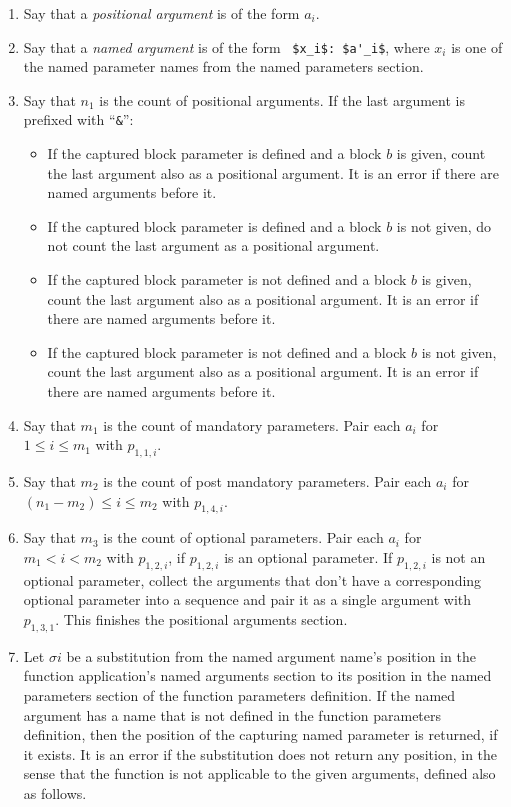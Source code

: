 \begin{enumerate}

\item Say that a {\em positional argument} is of the form $a_i$. 

\item Say that a {\em named argument} is of the form ~\lstinline!$x_i$: $a'_i$!, where $x_i$ is one of the named parameter names from the named parameters section. 

\item Say that $n_1$ is the count of positional arguments. If the last argument is prefixed with ``\lstinline!&!'':
\begin{itemize} 
\item If the captured block parameter is defined and a block $b$ is given, count the last argument also as a positional argument. It is an error if there are named arguments before it. 
\item If the captured block parameter is defined and a block $b$ is not given, do not count the last argument as a positional argument. 
\item If the captured block parameter is not defined and a block $b$ is given, count the last argument also as a positional argument. It is an error if there are named arguments before it. 
\item If the captured block parameter is not defined and a block $b$ is not given, count the last argument also as a positional argument. It is an error if there are named arguments before it. 
\end{itemize}

\item Say that $m_1$ is the count of mandatory parameters. Pair each $a_i$ for $1 \leq i \leq m_1$ with $p_{1,1,i}$. 

\item Say that $m_2$ is the count of post mandatory parameters. Pair each $a_i$ for $(n_1 - m_2) \leq i \leq m_2$ with $p_{1,4,i}$.

\item Say that $m_3$ is the count of optional parameters. Pair each $a_i$ for $m_1 < i < m_2$ with $p_{1,2,i}$, if $p_{1,2,i}$ is an optional parameter. If $p_{1,2,i}$ is not an optional parameter, collect the arguments that don't have a corresponding optional parameter into a sequence and pair it as a single argument with $p_{1,3,1}$. This finishes the positional arguments section. 

\item Let $\sigma i$ be a substitution from the named argument name's position in the function application's named arguments section to its position in the named parameters section of the function parameters definition. If the named argument has a name that is not defined in the function parameters definition, then the position of the capturing named parameter is returned, if it exists. It is an error if the substitution does not return any position, in the sense that the function is not applicable to the given arguments, defined also as follows. 


\end{enumerate}
